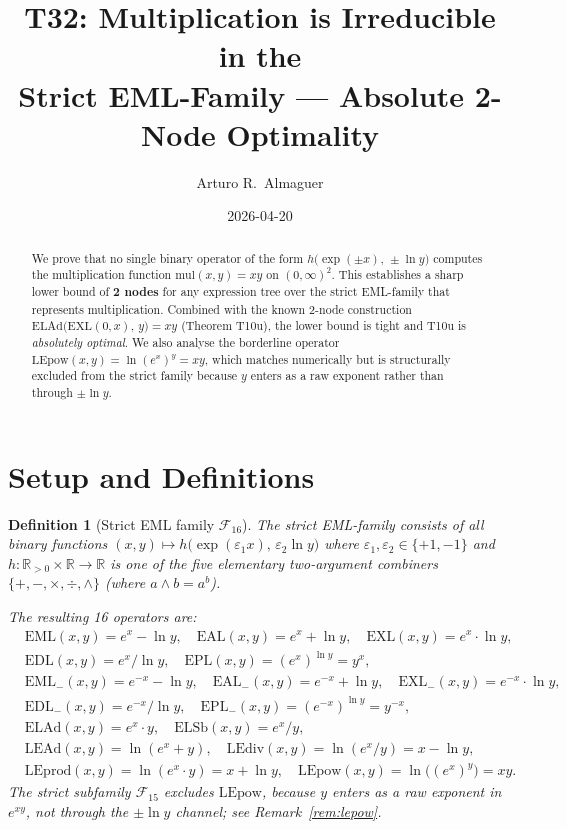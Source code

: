 \documentclass[11pt]{article}
\title{T32: Multiplication is Irreducible in the\\
       Strict EML-Family --- Absolute 2-Node Optimality}
\author{Arturo R.\ Almaguer}
\date{2026-04-20}
\newtheorem{definition}{Definition}[section]
\begin{document}
\maketitle

\begin{abstract}
We prove that no single binary operator of the form
$h\bigl(\exp(\pm x),\, \pm\ln y\bigr)$ computes
the multiplication function $\mathrm{mul}(x,y)=xy$ on $(0,\infty)^2$.
This establishes a sharp lower bound of \textbf{2 nodes} for any
expression tree over the strict EML-family that represents multiplication.
Combined with the known 2-node construction
$\mathrm{ELAd}\!\bigl(\mathrm{EXL}(0,x),\, y\bigr) = xy$
(Theorem T10u), the lower bound is tight and T10u is \emph{absolutely optimal}.
We also analyse the borderline operator $\mathrm{LEpow}(x,y)=\ln(e^x)^y = xy$,
which matches numerically but is structurally excluded from the strict family
because $y$ enters as a raw exponent rather than through $\pm\ln y$.
\end{abstract}

\section{Setup and Definitions}

\begin{definition}[Strict EML family $\mathcal{F}_{16}$]
\label{def:eml-family}
The \emph{strict EML-family} consists of all binary functions
$(x,y)\mapsto h\bigl(\exp(\varepsilon_1 x),\,\varepsilon_2\ln y\bigr)$
where $\varepsilon_1,\varepsilon_2\in\{+1,-1\}$ and
$h:\mathbb{R}_{>0}\times\mathbb{R}\to\mathbb{R}$ is one of
the five elementary two-argument combiners $\{+,-,\times,\div,\wedge\}$
(where $a\wedge b = a^b$).

The resulting 16 operators are:
\begin{align*}
&\mathrm{EML}(x,y)=e^x-\ln y,\quad
 \mathrm{EAL}(x,y)=e^x+\ln y,\quad
 \mathrm{EXL}(x,y)=e^x\cdot\ln y,\\
&\mathrm{EDL}(x,y)=e^x/\ln y,\quad
 \mathrm{EPL}(x,y)=(e^x)^{\ln y}=y^x,\\
&\mathrm{EML_{-}}(x,y)=e^{-x}-\ln y,\quad
 \mathrm{EAL_{-}}(x,y)=e^{-x}+\ln y,\quad
 \mathrm{EXL_{-}}(x,y)=e^{-x}\cdot\ln y,\\
&\mathrm{EDL_{-}}(x,y)=e^{-x}/\ln y,\quad
 \mathrm{EPL_{-}}(x,y)=(e^{-x})^{\ln y}=y^{-x},\\
&\mathrm{ELAd}(x,y)=e^x\cdot y,\quad
 \mathrm{ELSb}(x,y)=e^x/y,\\
&\mathrm{LEAd}(x,y)=\ln(e^x+y),\quad
 \mathrm{LEdiv}(x,y)=\ln(e^x/y)=x-\ln y,\\
&\mathrm{LEprod}(x,y)=\ln(e^x\cdot y)=x+\ln y,\quad
 \mathrm{LEpow}(x,y)=\ln\!\bigl((e^x)^y\bigr)=xy.
\end{align*}
The \emph{strict subfamily} $\mathcal{F}_{15}$ excludes $\mathrm{LEpow}$,
because $y$ enters as a raw exponent in $e^{xy}$, not through the
$\pm\ln y$ channel; see Remark~\ref{rem:lepow}.
\end{definition}
\end{document}

